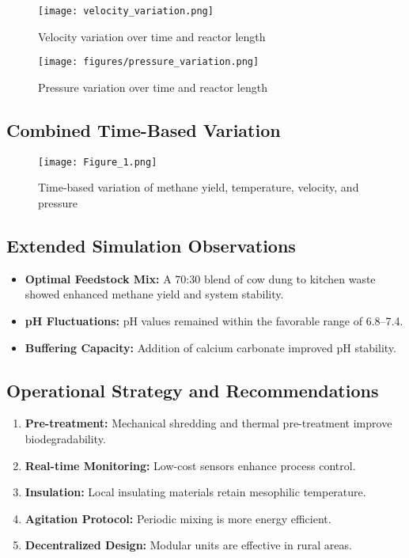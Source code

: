 \documentclass[12pt,a4paper]{article}
\begin{document}
\begin{figure}[H]
\centering
\texttt{[image: velocity\_variation.png]}
\caption{Velocity variation over time and reactor length}
\label{fig:velocity_var}
\end{figure}

\begin{figure}[H]
\centering
\texttt{[image: figures/pressure\_variation.png]}
\caption{Pressure variation over time and reactor length}
\label{fig:pressure_var}
\end{figure}

\subsection{Combined Time-Based Variation}
\begin{figure}[H]
\centering
\texttt{[image: Figure\_1.png]}
\caption{Time-based variation of methane yield, temperature, velocity, and pressure}
\label{fig:combined_line}
\end{figure}

\subsection{Extended Simulation Observations}
\begin{itemize}
    \item \textbf{Optimal Feedstock Mix:} A 70:30 blend of cow dung to kitchen waste showed enhanced methane yield and system stability.
    \item \textbf{pH Fluctuations:} pH values remained within the favorable range of 6.8--7.4.
    \item \textbf{Buffering Capacity:} Addition of calcium carbonate improved pH stability.
\end{itemize}

\subsection{Operational Strategy and Recommendations}
\begin{enumerate}
    \item \textbf{Pre-treatment:} Mechanical shredding and thermal pre-treatment improve biodegradability.
    \item \textbf{Real-time Monitoring:} Low-cost sensors enhance process control.
    \item \textbf{Insulation:} Local insulating materials retain mesophilic temperature.
    \item \textbf{Agitation Protocol:} Periodic mixing is more energy efficient.
    \item \textbf{Decentralized Design:} Modular units are effective in rural areas.
\end{enumerate}
\end{document}
